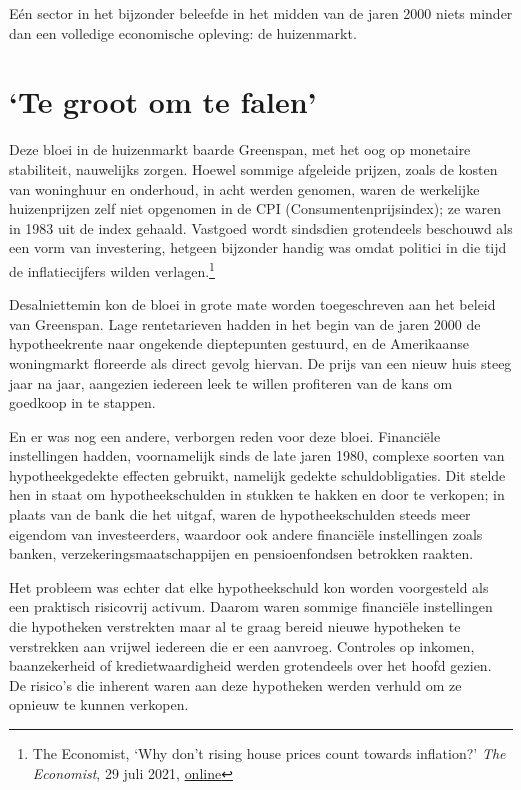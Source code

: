 \documentclass[
  a5paper,
  smalldemyvopaper,11pt,twoside,onecolumn,openright,extrafontsizes]{memoir}
\begin{document}
Eén sector in het bijzonder beleefde in het midden van de jaren 2000
niets minder dan een volledige economische opleving: de huizenmarkt.

\section{`Te groot om te falen'}\label{te-groot-om-te-falen}

Deze bloei in de huizenmarkt baarde Greenspan, met het oog op monetaire
stabiliteit, nauwelijks zorgen. Hoewel sommige afgeleide prijzen, zoals
de kosten van woninghuur en onderhoud, in acht werden genomen, waren de
werkelijke huizenprijzen zelf niet opgenomen in de CPI
(Consumentenprijsindex); ze waren in 1983 uit de index gehaald. Vastgoed
wordt sindsdien grotendeels beschouwd als een vorm van investering,
hetgeen bijzonder handig was omdat politici in die tijd de
inflatiecijfers wilden verlagen.\footnote{The Economist, `Why don't
  rising house prices count towards inflation?' \emph{The Economist}, 29
  juli 2021,
  \href{https://www.economist.com/the-economist-explains/2021/07/29/why-dont-rising-house-prices-count-towards-inflation}{online}}

Desalniettemin kon de bloei in grote mate worden toegeschreven aan het
beleid van Greenspan. Lage rentetarieven hadden in het begin van de
jaren 2000 de hypotheekrente naar ongekende dieptepunten gestuurd, en de
Amerikaanse woningmarkt floreerde als direct gevolg hiervan. De prijs
van een nieuw huis steeg jaar na jaar, aangezien iedereen leek te willen
profiteren van de kans om goedkoop in te stappen.

En er was nog een andere, verborgen reden voor deze bloei. Financiële
instellingen hadden, voornamelijk sinds de late jaren 1980, complexe
soorten van hypotheekgedekte effecten gebruikt, namelijk gedekte
schuldobligaties. Dit stelde hen in staat om hypotheekschulden in
stukken te hakken en door te verkopen; in plaats van de bank die het
uitgaf, waren de hypotheekschulden steeds meer eigendom van
investeerders, waardoor ook andere financiële instellingen zoals banken,
verzekeringsmaatschappijen en pensioenfondsen betrokken raakten.

Het probleem was echter dat elke hypotheekschuld kon worden voorgesteld
als een praktisch risicovrij activum. Daarom waren sommige financiële
instellingen die hypotheken verstrekten maar al te graag bereid nieuwe
hypotheken te verstrekken aan vrijwel iedereen die er een aanvroeg.
Controles op inkomen, baanzekerheid of kredietwaardigheid werden
grotendeels over het hoofd gezien. De risico's die inherent waren aan
deze hypotheken werden verhuld om ze opnieuw te kunnen verkopen.
\end{document}
